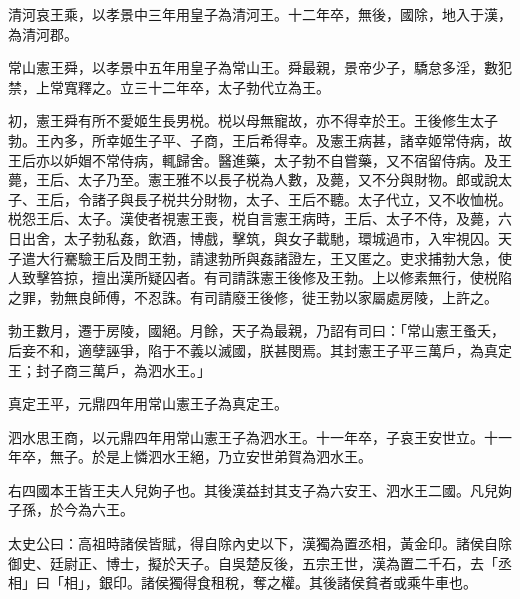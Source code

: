 \begin{pinyinscope}
清河哀王乘，以孝景中三年用皇子為清河王。十二年卒，無後，國除，地入于漢，為清河郡。

常山憲王舜，以孝景中五年用皇子為常山王。舜最親，景帝少子，驕怠多淫，數犯禁，上常寬釋之。立三十二年卒，太子勃代立為王。

初，憲王舜有所不愛姬生長男棁。棁以母無寵故，亦不得幸於王。王後修生太子勃。王內多，所幸姬生子平、子商，王后希得幸。及憲王病甚，諸幸姬常侍病，故王后亦以妒媢不常侍病，輒歸舍。醫進藥，太子勃不自嘗藥，又不宿留侍病。及王薨，王后、太子乃至。憲王雅不以長子棁為人數，及薨，又不分與財物。郎或說太子、王后，令諸子與長子棁共分財物，太子、王后不聽。太子代立，又不收恤棁。棁怨王后、太子。漢使者視憲王喪，棁自言憲王病時，王后、太子不侍，及薨，六日出舍，太子勃私姦，飲酒，博戲，擊筑，與女子載馳，環城過市，入牢視囚。天子遣大行騫驗王后及問王勃，請逮勃所與姦諸證左，王又匿之。吏求捕勃大急，使人致擊笞掠，擅出漢所疑囚者。有司請誅憲王後修及王勃。上以修素無行，使棁陷之罪，勃無良師傅，不忍誅。有司請廢王後修，徙王勃以家屬處房陵，上許之。

勃王數月，遷于房陵，國絕。月餘，天子為最親，乃詔有司曰：「常山憲王蚤夭，后妾不和，適孽誣爭，陷于不義以滅國，朕甚閔焉。其封憲王子平三萬戶，為真定王；封子商三萬戶，為泗水王。」

真定王平，元鼎四年用常山憲王子為真定王。

泗水思王商，以元鼎四年用常山憲王子為泗水王。十一年卒，子哀王安世立。十一年卒，無子。於是上憐泗水王絕，乃立安世弟賀為泗水王。

右四國本王皆王夫人兒姁子也。其後漢益封其支子為六安王、泗水王二國。凡兒姁子孫，於今為六王。

太史公曰：高祖時諸侯皆賦，得自除內史以下，漢獨為置丞相，黃金印。諸侯自除御史、廷尉正、博士，擬於天子。自吳楚反後，五宗王世，漢為置二千石，去「丞相」曰「相」，銀印。諸侯獨得食租稅，奪之權。其後諸侯貧者或乘牛車也。


\end{pinyinscope}
